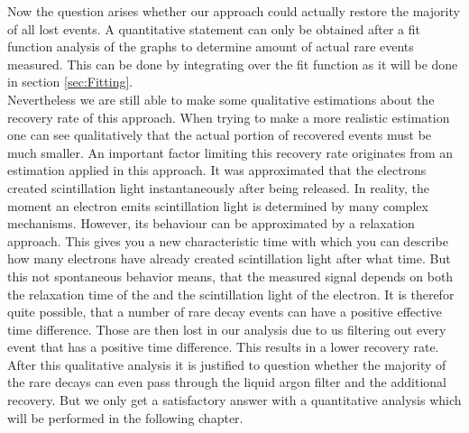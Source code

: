 Now the question arises whether our approach could actually restore the majority of all lost  events.
A quantitative statement can only be obtained after a fit function analysis of the graphs to determine amount of actual rare  events measured.
This can be done by integrating over the fit function as it will be done in section \ref{sec:Fitting}.
\\

Nevertheless we are still able to make some qualitative estimations about the recovery rate of this approach. 
When trying to make a more realistic estimation one can see qualitatively that the actual portion of recovered events must be much smaller.
An important factor limiting this recovery rate originates from an estimation applied in this approach.
It was approximated that the electrons created scintillation light instantaneously after being released.
In reality, the moment an electron emits scintillation light is determined by many complex mechanisms. 
However, its behaviour can be approximated by a relaxation approach. 
This gives you a new characteristic time with which you can describe how many electrons have already created scintillation light after what time. 
But this not spontaneous behavior means, that the measured signal depends on both the relaxation time of the  and the scintillation light of the electron.
It is therefor quite possible, that a number of rare  decay events can have a positive effective time difference.
Those are then lost in our analysis due to us filtering out every event that has a positive time difference.
This results in a lower recovery rate.
\\

After this qualitative analysis it is justified to question whether the majority of the rare  decays can even pass through the liquid argon filter and the additional recovery.
But we only get a satisfactory answer with a quantitative analysis which will be performed in the following chapter.
\\

